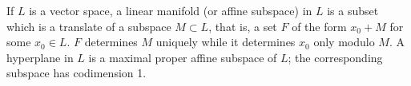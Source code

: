 If $L$ is a vector space, a linear manifold (or affine subspace) in $L$ is a subset which is a translate of a subspace $M \subset L$, that is, a set $F$ of the form $x_0 + M$ for some $x_0 \in L$. $F$ determines $M$ uniquely while it determines $x_0$ only modulo $M$. A hyperplane in $L$ is a maximal proper affine subspace of $L$; the corresponding subspace has codimension 1.

